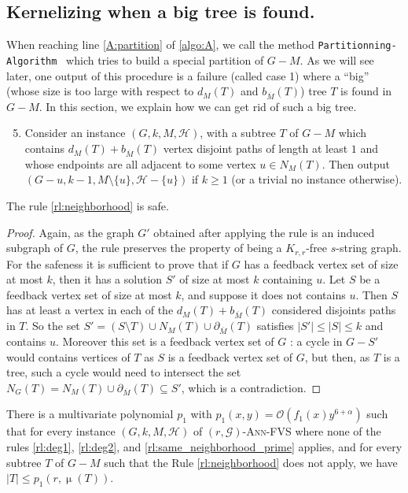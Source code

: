 \documentclass{amsart}
\newcommand{\KR}[1]{KR$_ #1$}
\newcommand{\algopart }{\texttt{Partitionning-Algorithm}~ }
\newcommand{\G}{\mathcal{G}}
\newcommand{\pom}{\partial_{\overline{M}}}
\newcommand{\bom}{b_{\overline{M}}}
\newcommand{\mH}{\mathcal{H}}
\DeclareMathOperator\db{\mu}
\newcommand{\AFVS}{\textsc{$(r,\G)$-Ann-FVS}\xspace}
\newcommand{\ruleref}[1]{\hyperref[#1]{\ref*{#1}}}
\renewcommand{\O}{\mathcal{O}}
\begin{document}
\subsection{Kernelizing when a big tree is found.}\label{sec:bigT}
When reaching line \ref{A:partition} of \autoref{algo:A}, we call the method \algopart which tries to build a special partition of $G-M$. As we will see later, one output of this procedure is a failure (called case 1) where a ``big'' (whose size is too large with respect to $d_M(T)$ and $\bom(T)$) tree $T$ is found in $G-M$. 
In this section, we explain how we can get rid of such a big tree.


\begin{enumerate}[label=(\KR{{\arabic*}})]
\setcounter{enumi}{4}
\item \label{rl:neighborhood} Consider an instance $(G, k, M, \mH)$, with a subtree $T$ of $G-M$ which contains $d_M(T)+\bom(T)$ vertex disjoint paths of length at least $1$ and whose endpoints are all adjacent to some vertex $u\in N_M(T)$. Then output $\left(G-u, k-1, M\setminus\{u\}, \mH-\{u\}\right)$ if $k \ge 1$ (or a trivial no instance otherwise).
\end{enumerate}

\begin{lemma}
    The rule \ruleref{rl:neighborhood} is safe.
\end{lemma}
\begin{proof}
Again, as the graph $G'$ obtained after applying the rule is an induced subgraph of $G$, the rule preserves the property of being a $K_{r,r}$-free $s$-string graph. For the safeness it is sufficient to prove that if $G$ has a feedback vertex set of size at most $k$, then it has a solution $S'$ of size at most $k$ containing $u$. Let $S$ be a feedback vertex set of size at most $k$, and suppose it does not contains $u$. Then $S$ has at least a vertex in each of the $d_M(T)+\bom(T)$ considered disjoints paths in $T$. So the set $S'=(S\setminus T)\cup N_M(T) \cup \pom(T)$ satisfies $|S'|\leq |S|\leq k$ and contains $u$. Moreover this set is a feedback vertex set of $G$ : a cycle in $G-S'$ would contains vertices of $T$ as $S$ is a feedback vertex set of $G$, but then, as $T$ is a tree, such a cycle would need to intersect the set $N_G(T)=N_M(T)\cup \pom(T)\subseteq S'$, which is a contradiction.
\end{proof}



\begin{lemma}\label{lem:subtree-size}
There is a multivariate polynomial $p_1$ with $p_1(x,y) = \O(f_1(x) y^{6+\alpha})$ such that for every instance $(G,k,M,\mH)$ of \AFVS where none of the rules \ruleref{rl:deg1}, \ruleref{rl:deg2}, and \ruleref{rl:same_neighborhood_prime} applies, and for every subtree $T$ of $G-M$ such that the Rule \ruleref{rl:neighborhood} does not apply, we have $|T| \le p_1(r,\db(T))$.
\end{lemma}
\end{document}

